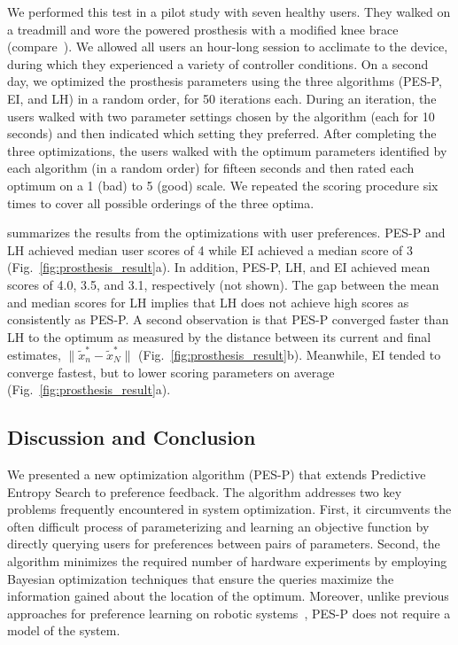 We performed this test in a pilot study with seven healthy users. They walked
on a treadmill and wore the powered prosthesis with a modified knee brace
(compare~\citep{thatte2016toward}). We allowed all users an hour-long session to
acclimate to the device, during which they experienced a variety of controller
conditions. On a second day, we optimized the prosthesis parameters using the
three algorithms (PES-P, EI, and LH) in a random order, for 50 iterations each.
During an iteration, the users walked with two parameter settings chosen by the
algorithm (each for 10 seconds) and then indicated which setting they
preferred. After completing the three optimizations, the users walked with the
optimum parameters identified by each algorithm (in a random order) for fifteen
seconds and then rated each optimum on a 1 (bad) to 5 (good) scale. We repeated
the scoring procedure six times to cover all possible orderings of the three
optima.

 summarizes the results from the optimizations with
user preferences. PES-P and LH achieved median user scores of 4 while EI
achieved a median score of 3 (Fig.~\ref{fig:prosthesis_result}a). In addition,
PES-P, LH, and EI achieved mean scores of 4.0, 3.5, and 3.1, respectively (not
shown). The gap between the mean and median scores for LH implies that LH does
not achieve high scores as consistently as PES-P. A second observation is that
PES-P converged faster than LH to the optimum as measured by the distance
between its current and final estimates, $\lVert \tilde{x}_n^* - \tilde{x}_N^*
\rVert$ (Fig.~\ref{fig:prosthesis_result}b).  Meanwhile, EI tended to converge
fastest, but to lower scoring parameters on average
(Fig.~\ref{fig:prosthesis_result}a).

\subsection{Discussion and Conclusion}
We presented a new optimization algorithm (PES-P) that extends Predictive
Entropy Search to preference feedback. The algorithm addresses two key problems
frequently encountered in system optimization. First, it circumvents the often
difficult process of parameterizing and learning an objective function by
directly querying users for preferences between pairs of parameters. Second, the
algorithm minimizes the required number of hardware experiments by employing
Bayesian optimization techniques that ensure the queries maximize the
information gained about the location of the optimum. Moreover, unlike previous
approaches for preference learning on robotic systems~\citep{wilson2012bayesian,
jain2013learning}, PES-P does not require a model of the system.

